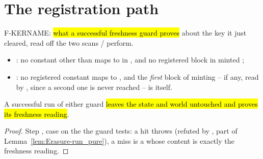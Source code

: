 \section{The registration path}
\label{sec:run:reg}

\begin{definition}
\label{def:Erasure-KernameFresh}
\leanok
{}
 F-KERNAME: \hl{what a successful freshness guard proves} about the key it just
cleared, read off the two scans /
perform.
\begin{itemize}
\item {}: no constant other than  maps to  in
, and no registered block in  minted ;
\item {}: no registered constant maps to , and the
\emph{first} block of  minting  -- if any, read by , since
a second one is never reached -- is  itself.
\end{itemize}
\end{definition}

\begin{lemma}
\label{lem:Erasure-run_checkKernameFresh_ok}
\leanok
{}
 A successful run of either guard \hl{leaves the state and world untouched and
proves its freshness reading}.
\end{lemma}
\begin{proof}
\leanok
{}
 Step , case on the  the guard tests: a hit throws
(refuted by , part of Lemma~\ref{lem:Erasure-run_pure}), a miss is a
 whose  content is exactly the freshness reading.
\end{proof}

